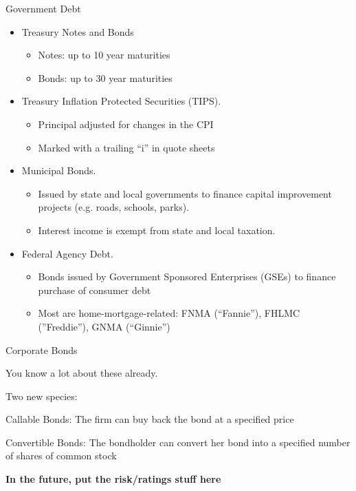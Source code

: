 \documentclass{beamer}
\begin{document}
\begin{frame}{Government Debt}
\begin{itemize}
\item Treasury Notes and Bonds
\begin{itemize}
\item Notes: up to 10 year maturities
\item Bonds: up to 30 year maturities
\end{itemize}
\item Treasury Inflation Protected Securities (TIPS).
\begin{itemize}
\item Principal adjusted for changes in the CPI
\item Marked with a trailing ``i'' in quote sheets
\end{itemize}
\item Municipal Bonds.
\begin{itemize}
\item Issued by state and local governments to finance capital improvement projects (e.g. roads, schools, parks). 
\item Interest income is exempt from state and local taxation.
\end{itemize}
\item Federal Agency Debt.
\begin{itemize}
\item Bonds issued by Government Sponsored Enterprises (GSEs) to finance purchase of consumer debt
\item Most are home-mortgage-related: FNMA (``Fannie''), FHLMC (''Freddie''), GNMA (``Ginnie'')
\end{itemize}
\end{itemize}
\end{frame}

\begin{frame}{Corporate Bonds}
\item You know a lot about these already. 
\item Two new species:
\item Callable Bonds: The firm can buy back the bond at a specified price
\item Convertible Bonds: The bondholder can convert her bond into a specified number of shares of common stock
\item\textbf{\color{red}In the future, put the risk/ratings stuff here}
\end{frame}
\end{document}

